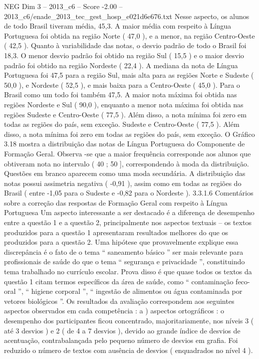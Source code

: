 \begin{textsample}{NEG Dim 3 – 2013\_c6 – Score -2.00 – 2013\_c6/enade\_2013\_tec\_gest\_hosp\_e021d6e676.txt}
Nesse aspecto, os alunos de todo Brasil tiveram média, 45,3.
A maior média com respeito à Língua Portuguesa foi obtida na região Norte ( 47,0 ), e a menor, na região Centro-Oeste ( 42,5 ).
Quanto à variabilidade das notas, o desvio padrão de todo o Brasil foi 18,3.
O menor desvio padrão foi obtido na região Sul ( 15,5 ) e o maior desvio padrão foi obtido na região Nordeste ( 22,4 ).
A mediana da nota de Língua Portuguesa foi 47,5 para a região Sul, mais alta para as regiões Norte e Sudeste ( 50,0 ), e Nordeste ( 52,5 ), e mais baixa para a Centro-Oeste ( 45,0 ).
Para o Brasil como um todo foi também 47,5.
A maior nota máxima foi obtida nas regiões Nordeste e Sul ( 90,0 ), enquanto a menor nota máxima foi obtida nas regiões Sudeste e Centro-Oeste ( 77,5 ).
Além disso, a nota mínima foi zero em todas as regiões do país, sem exceção.
Sudeste e Centro-Oeste ( 77,5 ).
Além disso, a nota mínima foi zero em todas as regiões do país, sem exceção.
O Gráfico 3.18 mostra a distribuição das notas de Língua Portuguesa do Componente de Formação Geral.
Observa -se que a maior frequência corresponde aos alunos que obtiveram nota no intervalo ( 40 ; 50 ], correspondendo à moda da distribuição.
Questões em branco aparecem como uma moda secundária.
A distribuição das notas possui assimetria negativa ( -0,91 ), assim como em todas as regiões do Brasil ( entre -1,05 para o Sudeste e -0,82 para o Nordeste ). 3.3.1.6 Comentários sobre a correção das respostas de Formação Geral com respeito à Língua Portuguesa Um aspecto interessante a ser destacado é a diferença de desempenho entre a questão 1 e a questão 2, principalmente nos aspectos textuais – os textos produzidos para a questão 1 apresentaram resultados melhores do que os produzidos para a questão 2.
Uma hipótese que provavelmente explique essa discrepância é o fato de o tema “ saneamento básico ” ser mais relevante para profissionais de saúde do que o tema “ segurança e privacidade ”, constituindo tema trabalhado no currículo escolar.
Prova disso é que quase todos os textos da questão 1 citam termos específicos da área de saúde, como “ contaminação feco-oral ”, “ higiene corporal ”, “ ingestão de alimentos ou água contaminada por vetores biológicos ”.
Os resultados da avaliação correspondem aos seguintes aspectos observados em cada competência : a ) aspectos ortográficos : o desempenho dos participantes ficou concentrado, majoritariamente, nos níveis 3 ( até 3 desvios ) e 2 ( de 4 a 7 desvios ), devido ao grande índice de desvios de acentuação, contrabalançada pelo pequeno número de desvios em grafia.
Foi reduzido o número de textos com ausência de desvios ( enquadrados no nível 4 ).

\end{textsample}
